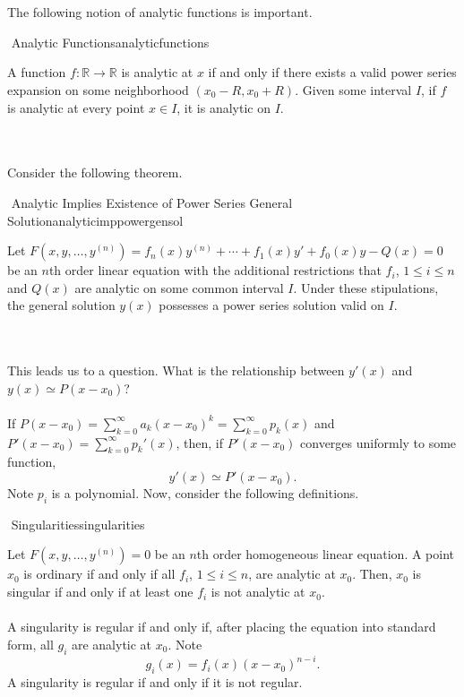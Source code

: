         \vphantom
        \\
        \\
        The following notion of analytic functions is important.
        \begin{definition}{\Stop\,\,Analytic Functions}{analyticfunctions}
            
            A function \(f:\mathbb{R}\to\mathbb{R}\) is analytic at \(x\) if and only if there exists a valid power series expansion on some neighborhood \((x_0-R,x_0+R)\). Given some interval \(I\), if \(f\) is analytic at every point \(x\in I\), it is analytic on \(I\).

        \end{definition}
        \pagebreak
        \vphantom
        \\
        \\
        Consider the following theorem.
        \begin{theorem}{\Stop\,\,Analytic Implies Existence of Power Series General Solution}{analyticimppowergensol}
            
            Let \(F(x,y,\ldots,y^{(n)})=f_n(x)y^{(n)}+\cdots+f_1(x)y'+f_0(x)y-Q(x)=0\) be an \(n\)th order linear equation with the additional restrictions that \(f_i\), \(1\leq i\leq n\) and \(Q(x)\) are analytic on some common interval \(I\). Under these stipulations, the general solution \(y(x)\) possesses a power series solution valid on \(I\).

        \end{theorem}
        \vphantom
        \\
        \\
        This leads us to a question. What is the relationship between \(y'(x)\) and \(y(x)\simeq P(x-x_0)\)?
        \\
        \\
        If \(P(x-x_0)=\sum_{k=0}^\infty a_k(x-x_0)^k=\sum_{k=0}^\infty p_k(x)\) and \(P'(x-x_0)=\sum_{k=0}^\infty p_k'(x)\), then, if \(P'(x-x_0)\) converges uniformly to some function,
        \begin{equation*}
            y'(x)\simeq P'(x-x_0).
        \end{equation*}
        Note \(p_i\) is a polynomial. Now, consider the following definitions.
        \begin{definition}{\Stop\,\,Singularities}{singularities}

            Let \(F(x,y,\ldots,y^{(n)})=0\) be an \(n\)th order homogeneous linear equation. A point \(x_0\) is ordinary if and only if all \(f_i\), \(1\leq i \leq n\), are analytic at \(x_0\). Then, \(x_0\) is singular if and only if at least one \(f_i\) is not analytic at \(x_0\).
            \\
            \\
            A singularity is regular if and only if, after placing the equation into standard form, all \(g_i\) are analytic at \(x_0\). Note
            \begin{equation*}
                g_i(x)=f_i(x)(x-x_0)^{n-i}.
            \end{equation*}
            A singularity is regular if and only if it is not regular.
        \end{definition}